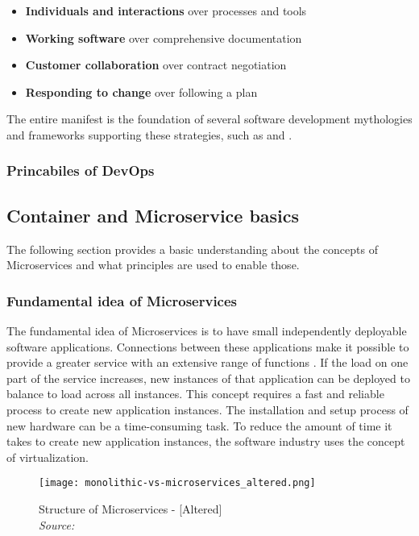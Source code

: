 \documentclass[12pt, a4paper]{article}
\begin{document}
        \begin{itemize}[label=\(\star\)]
            \item \textbf{Individuals and interactions} over processes and tools
            \item \textbf{Working software} over comprehensive documentation
            \item \textbf{Customer collaboration} over contract negotiation
            \item \textbf{Responding to change} over following a plan
        \end{itemize}

        The entire manifest is the foundation of several software development mythologies and frameworks supporting these strategies, such as  and .
        \subsubsection{Princabiles of DevOps}

    \subsection{Container and Microservice basics}
    The following section provides a basic understanding about the concepts of Microservices and what principles are used to enable those.
        \subsubsection{Fundamental idea of Microservices}
        The fundamental idea of Microservices is to have small independently deployable software applications. Connections between these applications make it possible to provide a greater service with an extensive range of functions \cite{micro}. If the load on one part of the service increases, new instances of that application can be deployed to balance to load across all instances. This concept requires a fast and reliable process to create new application instances.\newline
        The installation and setup process of new hardware can be a time-consuming task. To reduce the amount of time it takes to create new application instances, the software industry uses the concept of virtualization.

        \begin{figure}
            \centering
            \texttt{[image: monolithic-vs-microservices\_altered.png]}
            \caption{Structure of Microservices - [Altered] \\\textit{Source:~\cite{redhat_micro}}}\label{fig::micro}
        \end{figure}
\end{document}
